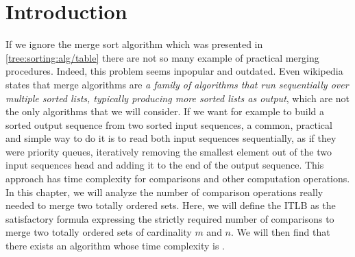 \section{Introduction}
\label{tree:merging:intro}

If we ignore the merge sort algorithm which was presented in \ref{tree:sorting:alg/table} there are not so many example of practical merging procedures. Indeed, this problem seems inpopular and outdated. Even wikipedia states that merge algorithms are \emph{a family of algorithms that run sequentially over multiple sorted lists, typically producing more sorted lists as output}, which are not the only algorithms that we will consider. If we want for example to build a sorted output sequence from two sorted input sequences, a common, practical and simple way to do it is to read both input sequences sequentially, as if they were priority queues, iteratively removing the smallest element out of the two input sequences head and adding it to the end of the output sequence. This approach has  time complexity for comparisons and other computation operations. In this chapter, we will analyze the number of comparison operations really needed to merge two totally ordered sets. Here, we will define the ITLB as the satisfactory formula expressing the strictly required number of comparisons to merge two totally ordered sets of cardinality $m$ and $n$. We will then find that there exists an algorithm whose time complexity is .

